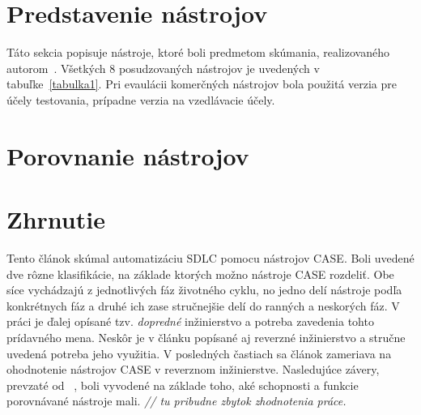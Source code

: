 \documentclass[10pt,twoside,slovak,a4paper]{article}
\begin{document}
\section{Predstavenie nástrojov}\label{predstavenie}


Táto sekcia popisuje nástroje, ktoré boli predmetom skúmania, realizovaného autorom~\cite{Osman:RE}. Všetkých 8 posudzovaných nástrojov je uvedených v tabuľke~\ref{tabulka1}. Pri evaulácii komerčných nástrojov bola použitá verzia pre účely testovania, prípadne verzia na vzedlávacie účely.

\section{Porovnanie nástrojov}\label{porovnanie}

\section{Zhrnutie} \label{zhrnutie} 
Tento článok skúmal automatizáciu SDLC pomocu nástrojov CASE. Boli uvedené dve rôzne klasifikácie, na základe ktorých možno nástroje CASE rozdeliť. Obe síce vychádzajú z jednotlivých fáz životného cyklu, no jedno delí nástroje podľa konkrétnych fáz a druhé ich zase stručnejšie delí do ranných a neskorých fáz.
V práci je ďalej opísané tzv. \emph{dopredné} inžinierstvo a potreba zavedenia tohto prídavného mena. Neskôr je v článku popísané aj reverzné inžinierstvo a stručne uvedená potreba jeho využitia. 
V posledných častiach sa článok zameriava na ohodnotenie nástrojov CASE v reverznom inžinierstve. Nasledujúce závery, prevzaté od~ \cite{Osman:RE}, boli vyvodené na základe toho, aké schopnosti a funkcie porovnávané nástroje mali.
\emph{// tu pribudne zbytok zhodnotenia práce.}






\end{document}
